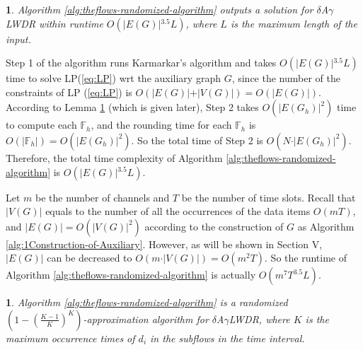 \documentclass[11pt,english,onecolumn,draftcls]{IEEEtran}
\theoremstyle{plain}
\theoremstyle{plain}
\theoremstyle{plain}
\newtheorem{lem}[thm]{\protect\lemmaname}
\theoremstyle{plain}
\providecommand{\lemmaname}{Lemma}
\begin{document}
\begin{lem}
\label{lem:flowOAtime}Algorithm \ref{alg:theflows-randomized-algorithm}
outputs a solution for $\delta$A$\gamma$LWDR within runtime $O(\vert E(G)\vert{}^{3.5}L)$,
where $L$ is the maximum length of the input.\end{lem}
\begin{IEEEproof}
Step 1 of the algorithm runs Karmarkar's algorithm and takes $O(\vert E(G)\vert{}^{3.5}L)$
time to solve LP(\ref{eq:LP}) wrt the auxiliary graph $G$, since
the number of the constraints of LP (\ref{eq:LP}) is $O(\vert E(G)\vert+\vert V(G)\vert)=O(\vert E(G)\vert)$.
According to Lemma \ref{lem:ratioOAflowLPadmits} (which is given
later), Step 2 takes $O(\vert E(G_{h})\vert^{2})$ time to compute
each $\mathbb{F}_{h}$, and the rounding time for each $\mathbb{F}_{h}$
is $O(\vert\mathbb{F}_{h}\vert)=O(\vert E(G_{h})\vert^{2})$. So the
total time of Step 2 is $O(N\cdot\vert E(G_{h})\vert^{2})$. Therefore,
the total time complexity of Algorithm \ref{alg:theflows-randomized-algorithm}
is $O(\vert E(G)\vert{}^{3.5}L)$.
\end{IEEEproof}
Let $m$ be the number of channels and $T$ be the number of time
slots. Recall that $\vert V(G)\vert$ equals to the number of all
the occurrences of the data items $O(mT)$, and $\vert E(G)\vert=O(\vert V(G)\vert^{2})$
according to the construction of $G$ as Algorithm \ref{alg:1Construction-of-Auxiliary}.
However, as will be shown in Section V, $\vert E(G)\vert$ can be
decreased to $O(m\cdot\vert V(G)\vert)=O(m^{2}T)$. So the runtime
of Algorithm \ref{alg:theflows-randomized-algorithm} is actually
$O(m^{7}T^{3.5}L)$.
\begin{lem}
\label{lem:ratioOAflowLPadmits}Algorithm \ref{alg:theflows-randomized-algorithm}
is a randomized $(1-(\frac{K-1}{K})^{K})$-approximation algorithm
for $\delta$A$\gamma$LWDR, where $K$ is the maximum occurrence
times of $d_{i}$ in the subflows in the time interval. \end{lem}
\end{document}
